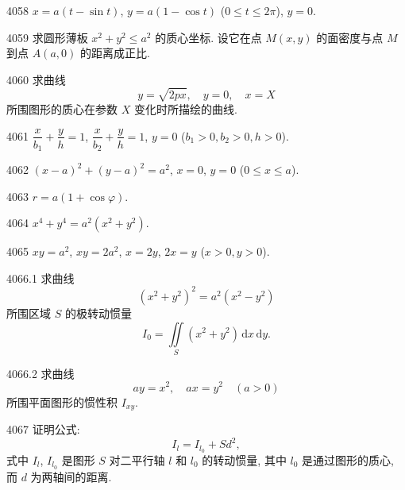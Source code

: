 \begin{prob}[S]{4058}
$x = a(t - \sin t)$, $y = a(1 - \cos t)$ ($0 \leqslant t \leqslant 2\pi$), $y = 0$.
\end{prob}

\begin{prob}[M]{4059}
求圆形薄板 $x^2 + y^2 \leqslant a^2$ 的质心坐标. 设它在点 $M(x,y)$ 的面密度与点 $M$ 到点 $A(a,0)$ 的距离成正比.
\end{prob}

\begin{prob}[M]{4060}
求曲线
\[
y = \sqrt{2px}, \quad y = 0, \quad x = X
\]
所围图形的质心在参数 $X$ 变化时所描绘的曲线.
\end{prob}


\begin{prob}[S]{4061}
$\dfrac{x}{b_1} + \dfrac{y}{h} = 1$, $\dfrac{x}{b_2} + \dfrac{y}{h} = 1$, $y = 0$ ($b_1 > 0, b_2 > 0, h > 0$).
\end{prob}

\begin{prob}[S]{4062}
$(x - a)^2 + (y - a)^2 = a^2$, $x = 0$, $y = 0$ ($0 \leqslant x \leqslant a$).
\end{prob}

\begin{prob}[S]{4063}
$r = a(1 + \cos\varphi)$.
\end{prob}

\begin{prob}[S]{4064}
$x^4 + y^4 = a^2(x^2 + y^2)$.
\end{prob}

\begin{prob}[S]{4065}
$xy = a^2$, $xy = 2a^2$, $x = 2y$, $2x = y$ ($x > 0, y > 0$).
\end{prob}

\begin{prob}[M]{4066.1}
求曲线
\[
(x^2 + y^2)^2 = a^2(x^2 - y^2)
\]
所围区域 $S$ 的极转动惯量
\[
I_0 = \iint\limits_S (x^2 + y^2)\,\mathrm{d}x\,\mathrm{d}y.
\]
\end{prob}

\begin{prob}[M]{4066.2}
求曲线
\[
ay = x^2, \quad ax = y^2 \quad (a > 0)
\]
所围平面图形的惯性积 $I_{xy}$.
\end{prob}

\begin{prob}[M]{4067}
证明公式:
\[
I_l = I_{l_0} + Sd^2,
\]
式中 $I_l$, $I_{l_0}$ 是图形 $S$ 对二平行轴 $l$ 和 $l_0$ 的转动惯量, 其中 $l_0$ 是通过图形的质心, 而 $d$ 为两轴间的距离.
\end{prob}

